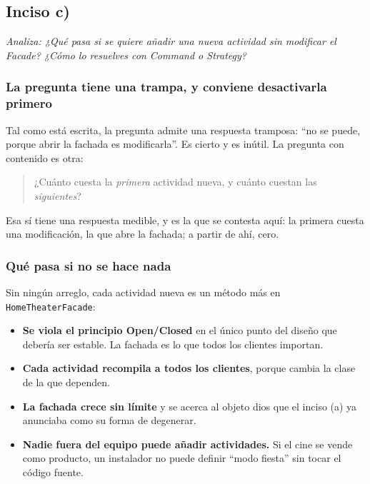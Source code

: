 {}
\subsection*{Inciso c)}

\sloppy

\textit{Analiza: ¿Qué pasa si se quiere añadir una nueva actividad sin modificar el Facade?
¿Cómo lo resuelves con Command o Strategy?}

\vspace{0.4cm}

\subsubsection*{La pregunta tiene una trampa, y conviene desactivarla primero}

Tal como está escrita, la pregunta admite una respuesta tramposa: ``no se puede, porque abrir
la fachada es modificarla''. Es cierto y es inútil. La pregunta con contenido es otra:

\begin{quote}
¿Cuánto cuesta la \emph{primera} actividad nueva, y cuánto cuestan las \emph{siguientes}?
\end{quote}

Esa sí tiene una respuesta medible, y es la que se contesta aquí: la primera cuesta una
modificación, la que abre la fachada; a partir de ahí, cero.

\subsubsection*{Qué pasa si no se hace nada}

Sin ningún arreglo, cada actividad nueva es un método más en \texttt{HomeTheaterFacade}:

\begin{itemize}[leftmargin=1.2cm]
    \item \textbf{Se viola el principio Open/Closed} en el único punto del diseño que debería
          ser estable. La fachada es lo que todos los clientes importan.
    \item \textbf{Cada actividad recompila a todos los clientes}, porque cambia la clase de
          la que dependen.
    \item \textbf{La fachada crece sin límite} y se acerca al objeto dios que el inciso (a)
          ya anunciaba como su forma de degenerar.
    \item \textbf{Nadie fuera del equipo puede añadir actividades.} Si el cine se vende como
          producto, un instalador no puede definir ``modo fiesta'' sin tocar el código
          fuente.
\end{itemize}


